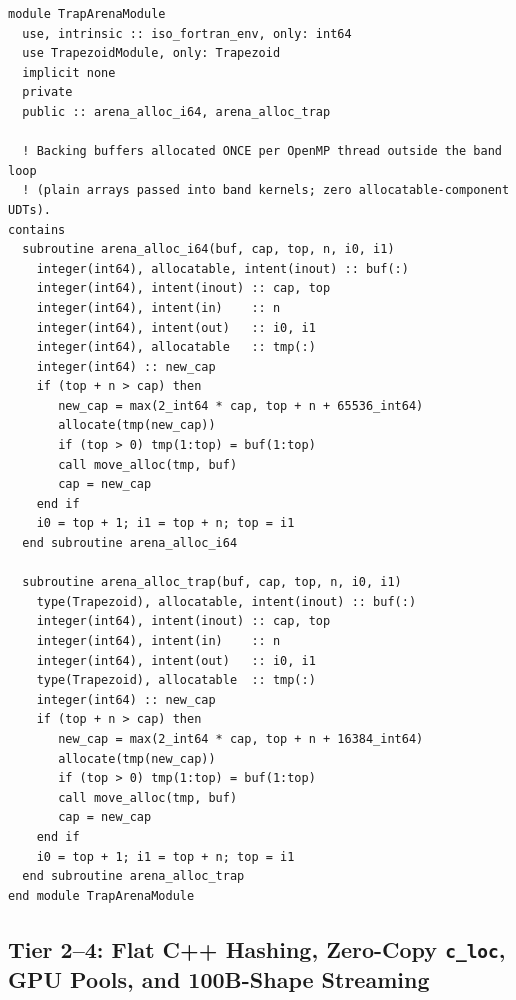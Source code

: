 \begin{lstlisting}[caption={Proposed \texttt{ifx}-safe Modern Fortran linear arena pattern (\texttt{TrapArenaModule}) for zero-consing band sweeps.},label={lst:arena}]
module TrapArenaModule
  use, intrinsic :: iso_fortran_env, only: int64
  use TrapezoidModule, only: Trapezoid
  implicit none
  private
  public :: arena_alloc_i64, arena_alloc_trap

  ! Backing buffers allocated ONCE per OpenMP thread outside the band loop
  ! (plain arrays passed into band kernels; zero allocatable-component UDTs).
contains
  subroutine arena_alloc_i64(buf, cap, top, n, i0, i1)
    integer(int64), allocatable, intent(inout) :: buf(:)
    integer(int64), intent(inout) :: cap, top
    integer(int64), intent(in)    :: n
    integer(int64), intent(out)   :: i0, i1
    integer(int64), allocatable   :: tmp(:)
    integer(int64) :: new_cap
    if (top + n > cap) then
       new_cap = max(2_int64 * cap, top + n + 65536_int64)
       allocate(tmp(new_cap))
       if (top > 0) tmp(1:top) = buf(1:top)
       call move_alloc(tmp, buf)
       cap = new_cap
    end if
    i0 = top + 1; i1 = top + n; top = i1
  end subroutine arena_alloc_i64

  subroutine arena_alloc_trap(buf, cap, top, n, i0, i1)
    type(Trapezoid), allocatable, intent(inout) :: buf(:)
    integer(int64), intent(inout) :: cap, top
    integer(int64), intent(in)    :: n
    integer(int64), intent(out)   :: i0, i1
    type(Trapezoid), allocatable  :: tmp(:)
    integer(int64) :: new_cap
    if (top + n > cap) then
       new_cap = max(2_int64 * cap, top + n + 16384_int64)
       allocate(tmp(new_cap))
       if (top > 0) tmp(1:top) = buf(1:top)
       call move_alloc(tmp, buf)
       cap = new_cap
    end if
    i0 = top + 1; i1 = top + n; top = i1
  end subroutine arena_alloc_trap
end module TrapArenaModule
\end{lstlisting}

\subsection{Tier 2--4: Flat C++ Hashing, Zero-Copy \texttt{c\_loc}, GPU Pools, and 100B-Shape Streaming}

